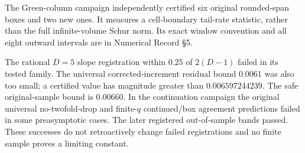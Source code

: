 The Green-column campaign independently certified six original rounded-span boxes and two new ones. It measures a cell-boundary tail-rate statistic, rather than the full infinite-volume Schur norm. Its exact window convention and all eight outward intervals are in Numerical Record \S5.

The rational $D=5$ slope registration within $0.25$ of $2(D-1)$ failed in its tested family. The universal corrected-increment residual bound $0.0061$ was also too small; a certified value has magnitude greater than $0.006597244239$. The safe original-sample bound is $0.00660$. In the continuation campaign the original universal no-twofold-drop and finite-$q$ continued/box agreement predictions failed in some preasymptotic cases. The later registered out-of-sample bands passed. These successes do not retroactively change failed registrations and no finite sample proves a limiting constant.
